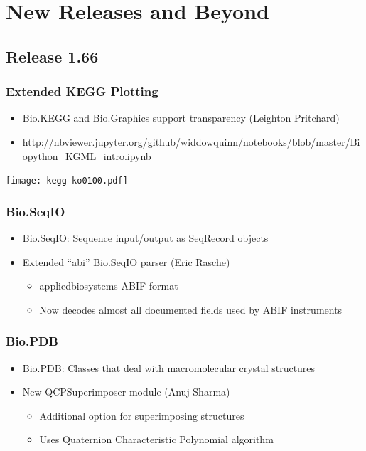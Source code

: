 \documentclass[trans]{beamer}
\begin{document}

\section{New Releases and Beyond}
\subsection*{Release 1.66}
\frame
{
}

\frame
{
  \frametitle{Extended KEGG Plotting}
  
  \begin{itemize}
  \item Bio.KEGG and Bio.Graphics support transparency (Leighton Pritchard)
  \item \url{http://nbviewer.jupyter.org/github/widdowquinn/notebooks/blob/master/Biopython_KGML_intro.ipynb}
  \end{itemize}
  
  \begin{center}
  \texttt{[image: kegg-ko0100.pdf]}
  \end{center}
}

\frame
{
  \frametitle{Bio.SeqIO}
  
  \begin{itemize}
  \item Bio.SeqIO: Sequence input/output as SeqRecord objects  
  \item Extended ``abi'' Bio.SeqIO parser (Eric Rasche)
  \begin{itemize}
  \item appliedbiosystems ABIF format
  \item Now decodes almost all documented fields used by ABIF instruments
  \end{itemize}
  \end{itemize}
}

\frame
{
  \frametitle{Bio.PDB}
  
  \begin{itemize}
  \item Bio.PDB: Classes that deal with macromolecular crystal structures  
  \item New QCPSuperimposer module (Anuj Sharma)
  \begin{itemize}
  \item Additional option for superimposing structures
  \item Uses Quaternion Characteristic Polynomial algorithm
  \end{itemize}
  \end{itemize}
}
\end{document}
